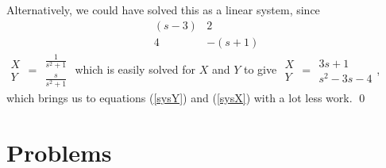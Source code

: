 \documentclass[12pt]{book}
\begin{document}
Alternatively, we could have solved this as a linear system, since
\bee
\[ \begin{array}{ll}
    (s-3) & 2\\
    4 & -(s+1)
  \end{array} \]
\( \begin{array}{l}
    X\\
    Y
  \end{array} \)
=
\( \begin{array}{l}
    \frac{1}{s^2+1}\\
    \frac{s}{s^2+1}
  \end{array} \)
\eee
which is easily solved for $X$ and $Y$ to give
\bee
\( \begin{array}{l}
    X\\
    Y
  \end{array} \)
=
 \cdot {}
\( \begin{array}{l}
    3s+1\\
    s^2 -3s -4
  \end{array} \),
\eee
which brings us to equations (\ref{sysY}) and (\ref{sysX}) with a lot less
work. \qed

\section{Problems}
\end{document}
